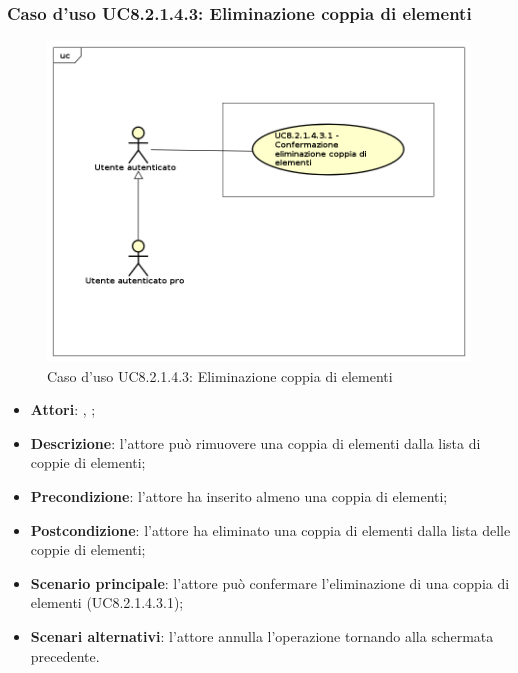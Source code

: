 	\subsubsection{Caso d'uso UC8.2.1.4.3: Eliminazione coppia di elementi}
	\label{UC8.2.1.4.3}
	\begin{figure}[h]
		\centering
		\includegraphics[scale=0.5,keepaspectratio]{UML/UC8_2_1_4_3.png}
		\caption{Caso d'uso UC8.2.1.4.3: Eliminazione coppia di elementi}
	\end{figure}
	\FloatBarrier
	\begin{itemize}
		\item \textbf{Attori}: \uau, \uaupro;
		\item \textbf{Descrizione}: l'attore può rimuovere una coppia di elementi dalla lista di coppie di elementi;
		\item \textbf{Precondizione}: l'attore ha inserito almeno una coppia di elementi;
		\item \textbf{Postcondizione}: l'attore ha eliminato una coppia di elementi dalla lista delle coppie di elementi;
		\item \textbf{Scenario principale}: l'attore può confermare l'eliminazione di una coppia di elementi (UC8.2.1.4.3.1);
		\item \textbf{Scenari alternativi}: l'attore annulla l'operazione tornando alla schermata precedente.
	\end{itemize}

